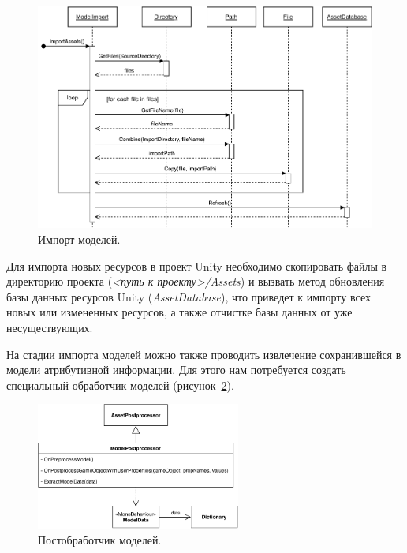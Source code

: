 \begin{figure}[ht]
    \centering
    \includegraphics[width=1.0\textwidth]{images/UML-SImportModels.pdf}
    \caption{Импорт моделей.}
    \label{figure:SImportModels}
\end{figure}

Для импорта новых ресурсов в проект Unity необходимо скопировать
файлы в директорию проекта (\emph{<путь к проекту>/Assets})
и вызвать метод обновления базы данных ресурсов Unity (\emph{AssetDatabase}),
что приведет к импорту всех новых или измененных ресурсов,
а также отчистке базы данных от уже несуществующих.%
\cite{DocUnity}

На стадии импорта моделей можно также проводить извлечение
сохранившейся в модели атрибутивной информации.
Для этого нам потребуется создать специальный обработчик моделей
(рисунок~\ref{figure:CPostprocessor}). 

\begin{figure}[ht]
    \centering
    \includegraphics[width=0.6\textwidth]{images/UML-CPostprocessor.pdf}
    \caption{Постобработчик моделей.}
    \label{figure:CPostprocessor}
\end{figure}

